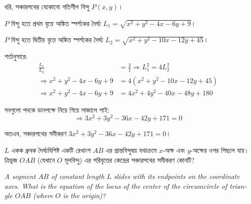 \documentclass[12pt, a4paper]{article}
\begin{document}
\begin{tcolorbox}[solutionbox={সমাধান (Solution)}]
    \noindent
    ধরি, সঞ্চারপথের যেকোনো গতিশীল বিন্দু $P(x, y)$।
    
    \vspace{0.5em}
    $P$ বিন্দু হতে প্রথম বৃত্তে অঙ্কিত স্পর্শকের দৈর্ঘ্য $L_1 = \sqrt{x^2 + y^2 - 4x - 6y + 9}$।
    
    \vspace{0.5em}
    $P$ বিন্দু হতে দ্বিতীয় বৃত্তে অঙ্কিত স্পর্শকের দৈর্ঘ্য $L_2 = \sqrt{x^2 + y^2 - 10x - 12y + 45}$।
    
    \vspace{0.5em}
    শর্তানুসারে:
    \begin{align*}
        \frac{L_1}{L_2} &= \frac{2}{1} \Rightarrow L_1^2 = 4L_2^2 \\
        \Rightarrow x^2 + y^2 - 4x - 6y + 9 &= 4(x^2 + y^2 - 10x - 12y + 45) \\
        \Rightarrow x^2 + y^2 - 4x - 6y + 9 &= 4x^2 + 4y^2 - 40x - 48y + 180
    \end{align*}
    
    \vspace{0.5em}
    সবগুলো পদকে ডানপক্ষে নিয়ে গিয়ে সাজালে পাই:
    \[ \Rightarrow 3x^2 + 3y^2 - 36x - 42y + 171 = 0 \]
    
    \vspace{0.5em}
    অতএব, সঞ্চারপথের সমীকরণ $3x^2 + 3y^2 - 36x - 42y + 171 = 0$।
\end{tcolorbox}

\vspace{2em}

\begin{tcolorbox}[questionbox={প্রশ্ন (Question) 36}]
    \noindent
    $L$ একক ধ্রুবক দৈর্ঘ্যবিশিষ্ট একটি রেখাংশ $AB$ এর প্রান্তবিন্দুদ্বয় যথাক্রমে $x$-অক্ষ এবং $y$-অক্ষের ওপর পিছলে যায়। ত্রিভুজ $OAB$ (যেখানে $O$ মূলবিন্দু) এর পরিবৃত্তের কেন্দ্রের সঞ্চারপথের সমীকরণ কোনটি?
    
    \vspace{0.8em}
    \begin{english}
    \noindent\textit{\color{darkgray}
    A segment $AB$ of constant length $L$ slides with its endpoints on the coordinate axes. What is the equation of the locus of the center of the circumcircle of triangle $OAB$ (where $O$ is the origin)?
    }
    \end{english}
\end{tcolorbox}
\end{document}
